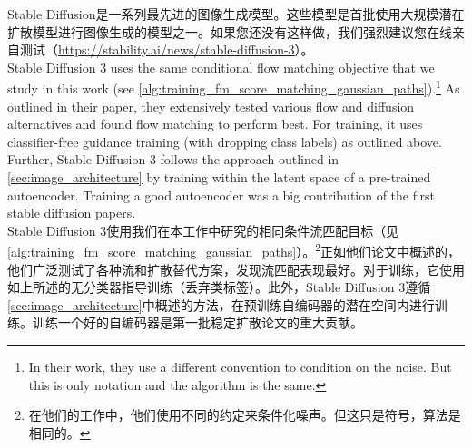 Stable Diffusion是一系列最先进的图像生成模型。这些模型是首批使用大规模潜在扩散模型进行图像生成的模型之一。如果您还没有这样做，我们强烈建议您在线亲自测试（\url{https://stability.ai/news/stable-diffusion-3}）。\\

Stable Diffusion 3 uses the same conditional flow matching objective that we study in this work (see \cref{alg:training_fm_score_matching_gaussian_paths}).\footnote{In their work, they use a different convention to condition on the noise. But this is only notation and the algorithm is the same.} As outlined in their paper, they extensively tested various flow and diffusion alternatives and found flow matching to perform best. For training, it uses classifier-free guidance training (with dropping class labels) as outlined above. Further, Stable Diffusion 3 follows the approach outlined in \cref{sec:image_architecture} by training within the latent space of a pre-trained autoencoder. Training a good autoencoder was a big contribution of the first stable diffusion papers.\\

Stable Diffusion 3使用我们在本工作中研究的相同条件流匹配目标（见\cref{alg:training_fm_score_matching_gaussian_paths}）。\footnote{在他们的工作中，他们使用不同的约定来条件化噪声。但这只是符号，算法是相同的。}正如他们论文中概述的，他们广泛测试了各种流和扩散替代方案，发现流匹配表现最好。对于训练，它使用如上所述的无分类器指导训练（丢弃类标签）。此外，Stable Diffusion 3遵循\cref{sec:image_architecture}中概述的方法，在预训练自编码器的潜在空间内进行训练。训练一个好的自编码器是第一批稳定扩散论文的重大贡献。\\

